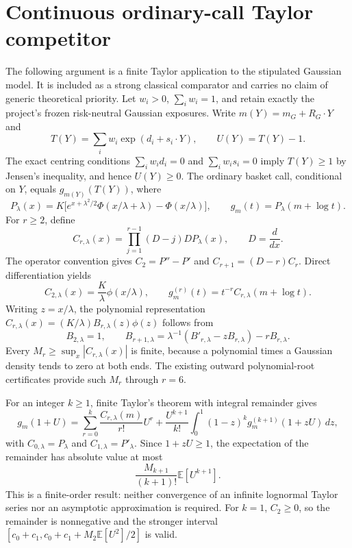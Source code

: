 \section{Continuous ordinary-call Taylor competitor}
\label{sec:ordinary-call-taylor-competitor}
The following argument is a finite Taylor application to the stipulated Gaussian model. It is included as a strong classical comparator and carries no claim of generic theoretical priority. Let $w_i>0$, $\sum_iw_i=1$, and retain exactly the project's frozen risk-neutral Gaussian exposures. Write $m(Y)=m_G+R_G\cdot Y$ and
\[
 T(Y)=\sum_iw_i\exp(d_i+s_i\cdot Y),\qquad U(Y)=T(Y)-1.
\]
The exact centring conditions $\sum_iw_id_i=0$ and $\sum_iw_is_i=0$ imply $T(Y)\geq1$ by Jensen's inequality, and hence $U(Y)\geq0$. The ordinary basket call, conditional on $Y$, equals $g_{m(Y)}(T(Y))$, where
\[
 P_{\lambda}(x)=K\bigl[e^{x+\lambda^2/2}\Phi(x/\lambda+\lambda)-\Phi(x/\lambda)\bigr],
 \qquad g_m(t)=P_{\lambda}(m+\log t).
\]
For $r\geq2$, define
\[
 C_{r,\lambda}(x)=\prod_{j=1}^{r-1}(D-j)D P_{\lambda}(x),\qquad D=\frac{d}{dx}.
\]
The operator convention gives $C_2=P''-P'$ and $C_{r+1}=(D-r)C_r$. Direct differentiation yields
\[
 C_{2,\lambda}(x)=\frac K\lambda\phi(x/\lambda),\qquad
 g_m^{(r)}(t)=t^{-r}C_{r,\lambda}(m+\log t).
\]
Writing $z=x/\lambda$, the polynomial representation $C_{r,\lambda}(x)=(K/\lambda)B_{r,\lambda}(z)\phi(z)$ follows from
\[
 B_{2,\lambda}=1,\qquad
 B_{r+1,\lambda}=\lambda^{-1}(B'_{r,\lambda}-zB_{r,\lambda})-rB_{r,\lambda}.
\]
Every $M_r\geq\sup_x|C_{r,\lambda}(x)|$ is finite, because a polynomial times a Gaussian density tends to zero at both ends. The existing outward polynomial-root certificates provide such $M_r$ through $r=6$.

For an integer $k\geq1$, finite Taylor's theorem with integral remainder gives
\[
 g_m(1+U)=\sum_{r=0}^{k}\frac{C_{r,\lambda}(m)}{r!}U^r+
 \frac{U^{k+1}}{k!}\int_0^1(1-z)^k g_m^{(k+1)}(1+zU)\,dz,
\]
with $C_{0,\lambda}=P_\lambda$ and $C_{1,\lambda}=P'_\lambda$. Since $1+zU\geq1$, the expectation of the remainder has absolute value at most
\[
 \frac{M_{k+1}}{(k+1)!}\mathbb E[U^{k+1}].
\]
This is a finite-order result: neither convergence of an infinite lognormal Taylor series nor an asymptotic approximation is required. For $k=1$, $C_2\geq0$, so the remainder is nonnegative and the stronger interval $[c_0+c_1,c_0+c_1+M_2\mathbb E[U^2]/2]$ is valid.

